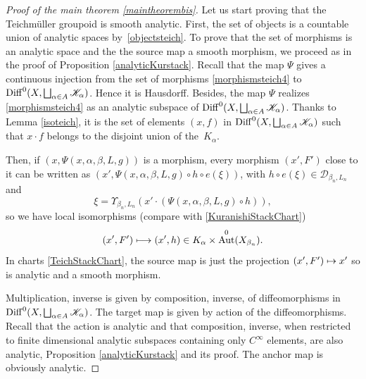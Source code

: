 \documentclass[JEP,XML,SOM,Unicode]{cedram}
\let\mathcal\mathscr
\let\oldbigsqcup\bigsqcup
\renewcommand{\bigsqcup}{\mathop{\textstyle\oldbigsqcup}\displaylimits}
\def\mto{\mathchoice{\longmapsto}{\mapsto}{\mapsto}{\mapsto}}
\DeclareMathOperator{\Aut}{Aut}
\DeclareMathOperator{\Diff}{Diff}
\theoremstyle{plain}
\theoremstyle{definition}
\theoremstyle{remark}
\numberwithin{equation}{section}
\newcommand{\DK}{\Diff^0(X,\bigsqcup_{\alpha\in A}\mathcal K_\alpha)}
\begin{document}
\begin{proof}[Proof of the main theorem \ref{maintheorembis}]
Let us start proving that the Teichmüller groupoid is smooth analytic. First, the set of objects is a countable union of analytic spaces by~\eqref{objectsteich}. To prove that the set of morphisms is an analytic space and the the source map a smooth morphism, we proceed as in the proof of Proposition \ref{analyticKurstack}. Recall that the map $\Psi$ gives a continuous injection from the set of morphisms \eqref{morphismsteich4} to $\DK$. Hence it is Hausdorff. Besides, the map $\Psi$ realizes \eqref{morphismsteich4} as an analytic subspace of $\DK$. Thanks to Lemma \ref{isoteich}, it is the set of elements $(x,f)$ in $\DK$ such that $x\cdot f$ belongs to the disjoint union of the~$K_\alpha$.

Then, if $(x,\Psi(x,\alpha,\beta, L,g))$ is a morphism, every morphism $(x',F')$ close to it can be written as $(x',\Psi(x,\alpha,\beta, L,g)\circ h\circ e(\xi))$, with $h\circ e(\xi)\in \mathcal D_{\beta_n,L_n}$ and
\begin{equation}
\label{xichart}
\xi=\Upsilon_{\beta_n,L_n}(x'\cdot (\Psi(x,\alpha,\beta, L,g)\circ h)),
\end{equation}
so we have local isomorphisms (compare with \eqref{KuranishiStackChart})
\begin{equation}
\label{TeichStackChart}
(x',F')\mto (x',h)\in K_\alpha\times \Aut^0(X_{\beta_n}).
\end{equation}
In charts \eqref{TeichStackChart}, the source map is just the projection $(x',F')\mto x'$
so is analytic and a smooth morphism.

Multiplication, \resp inverse is given by composition, \resp inverse, of diffeomorphisms in $\DK$. The target map is given by action of the diffeomorphisms. Recall that the action is analytic and that composition, \resp inverse, when restricted to finite dimensional analytic subspaces containing only $C^\infty$ elements, are also analytic, \cf Proposition \ref{analyticKurstack} and its proof. The anchor map is obviously analytic.


\end{proof}
\end{document}
